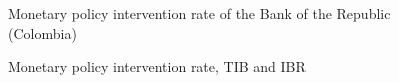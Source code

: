 \documentclass[
  ignorenonframetext,
]{beamer}
\begin{document}
\begin{frame}{}
\label{section-15}
\begin{figure}


\caption{\label{fig-daily-pir-col}Monetary policy intervention rate of
the Bank of the Republic (Colombia)}

\end{figure}%
\end{frame}

\begin{frame}{}
\label{section-16}
\begin{figure}


\caption{\label{fig-daily-pir-tib-ibr-col}Monetary policy intervention
rate, TIB and IBR}

\end{figure}%
\end{frame}
\end{document}
